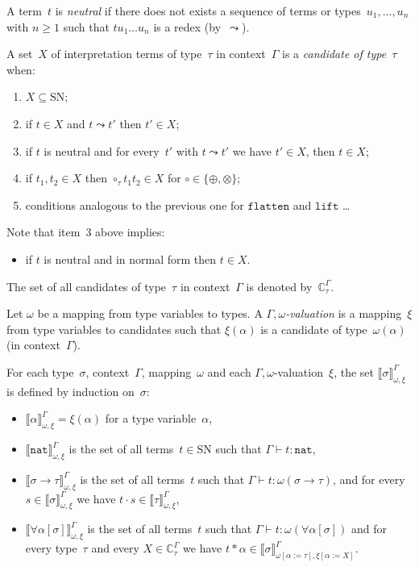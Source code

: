 \documentclass[runningheads,a4paper]{llncs}
\newcommand{\app}[2]{#1 \cdot #2}
\newcommand{\tapp}[2]{#1 * #2}
\newcommand{\subst}[2]{#1:=#2}
\newcommand{\nat}{\mathtt{nat}}
\newcommand{\flatten}{\mathtt{flatten}}
\newcommand{\lift}{\mathtt{lift}}
\newcommand{\SN}{\mathrm{SN}}
\newcommand{\Cb}{\mathbb{C}}
\newcommand{\val}[3]{\ensuremath{\llbracket#1\rrbracket_{#2}^{#3}}}
\newcommand{\proves}{\vdash}
\begin{document}
\begin{definition}\label{def_candidate}
  A term~$t$ is \emph{neutral} if there does not exists a sequence of
  terms or types~$u_1,\ldots,u_n$ with $n \ge 1$ such that
  $t u_1 \ldots u_n$ is a redex (by~$\leadsto$).

  A set~$X$ of interpretation terms of type~$\tau$ in context~$\Gamma$
  is a \emph{candidate of type~$\tau$} when:
  \begin{enumerate}
  \item $X \subseteq \SN$;
  \item if $t \in X$ and $t \leadsto t'$ then $t' \in X$;
  \item if $t$ is neutral and for every~$t'$ with $t \leadsto t'$ we
    have $t' \in X$, then $t \in X$;
  \item if $t_1,t_2 \in X$ then $\circ_\tau t_1 t_2 \in X$ for $\circ
    \in \{\oplus,\otimes\}$;
  \item conditions analogous to the previous one for $\flatten$ and
    $\lift$ \ldots
  \end{enumerate}
  Note that item~3 above implies:
  \begin{itemize}
  \item if $t$ is neutral and in normal form then $t \in X$.
  \end{itemize}
  The set of all candidates of type~$\tau$ in context~$\Gamma$ is
  denoted by~$\Cb_\tau^\Gamma$.
\end{definition}

\begin{definition}\label{def_reducibility_valuation}
  Let $\omega$ be a mapping from type variables to types. A
  \emph{$\Gamma,\omega$-valuation} is a mapping~$\xi$ from type
  variables to candidates such that $\xi(\alpha)$ is a candidate of
  type~$\omega(\alpha)$ (in context~$\Gamma$).

  For each type~$\sigma$, context~$\Gamma$, mapping~$\omega$
  and each $\Gamma,\omega$-valuation~$\xi$, the set $\val{\sigma}{\omega,\xi}{\Gamma}$ is
  defined by induction on~$\sigma$:
  \begin{itemize}
  \item $\val{\alpha}{\omega,\xi}{\Gamma} = \xi(\alpha)$ for a type
    variable~$\alpha$,
  \item $\val{\nat}{\omega,\xi}{\Gamma}$ is the set of all
    terms~$t \in \SN$ such that $\Gamma \proves t : \nat$,
  \item $\val{\sigma \to \tau}{\omega,\xi}{\Gamma}$ is the set of all
    terms~$t$ such that $\Gamma \proves t : \omega(\sigma \to \tau)$,
    and for every~$s \in \val{\sigma}{\omega,\xi}{\Gamma}$ we have
    $\app{t}{s} \in \val{\tau}{\omega,\xi}{\Gamma}$,
  \item $\val{\forall\alpha[\sigma]}{\omega,\xi}{\Gamma}$ is the set
    of all terms~$t$ such that
    $\Gamma \proves t : \omega(\forall\alpha[\sigma])$ and for every
    type~$\tau$ and every $X \in \Cb_\tau^\Gamma$ we have
    $\tapp{t}{\alpha} \in
    \val{\sigma}{\omega[\subst{\alpha}{\tau}],\xi[\subst{\alpha}{X}]}{\Gamma}$.
  \end{itemize}
\end{definition}
\end{document}
